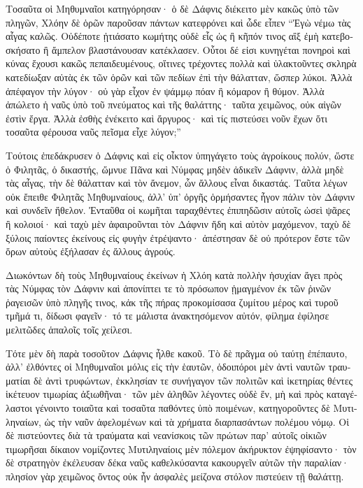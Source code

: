 \documentclass{book}
\begin{document}
\begin{pairs}
\begin{Leftside}
\begin{greek}
  Τοσαῦτα οἱ Μηθυμναῖοι κατηγόρησαν· ὁ δὲ Δάφνις διέκειτο μὲν κακῶς ὑπὸ τῶν πληγῶν, Χλόην δὲ ὁρῶν παροῦσαν πάντων κατεφρόνει καὶ ὧδε εἶπεν “Ἐγὼ νέμω τὰς αἶγας καλῶς. Οὐδέποτε ᾐτιάσατο κωμήτης οὐδὲ εἷς ὡς ἢ κῆπόν τινος αἲξ ἐμὴ κατεβοσκήσατο ἢ ἄμπελον βλαστάνουσαν κατέκλασεν.  Οὗτοι δέ εἰσι κυνηγέται πονηροὶ καὶ κύνας ἔχουσι κακῶς πεπαιδευμένους, οἵτινες τρέχοντες πολλὰ καὶ ὑλακτοῦντες σκληρὰ κατεδίωξαν αὐτὰς ἐκ τῶν ὀρῶν καὶ τῶν πεδίων ἐπὶ τὴν θάλατταν, ὥσπερ λύκοι.  Ἀλλὰ ἀπέφαγον τὴν λύγον· οὐ γὰρ εἶχον ἐν ψάμμῳ πόαν ἢ κόμαρον ἢ θύμον. Ἀλλὰ ἀπώλετο ἡ ναῦς ὑπὸ τοῦ πνεύματος καὶ τῆς θαλάττης· ταῦτα χειμῶνος, οὐκ αἰγῶν ἐστὶν ἔργα. Ἀλλὰ ἐσθὴς ἐνέκειτο καὶ ἄργυρος· καὶ τίς πιστεύσει νοῦν ἔχων ὅτι τοσαῦτα φέρουσα ναῦς πεῖσμα εἶχε λύγον;”
\pend


  Τούτοις ἐπεδάκρυσεν ὁ Δάφνις καὶ εἰς οἶκτον ὑπηγάγετο τοὺς ἀγροίκους πολύν, ὥστε ὁ Φιλητᾶς, ὁ δικαστής, ὤμνυε Πᾶνα καὶ Νύμφας μηδὲν ἀδικεῖν Δάφνιν, ἀλλὰ μηδὲ τὰς αἶγας, τὴν δὲ θάλατταν καὶ τὸν ἄνεμον, ὧν ἄλλους εἶναι δικαστάς.  Ταῦτα λέγων οὐκ ἔπειθε Φιλητᾶς Μηθυμναίους, ἀλλ’ ὑπ’ ὀργῆς ὁρμήσαντες ἦγον πάλιν τὸν Δάφνιν καὶ συνδεῖν ἤθελον.  Ἐνταῦθα οἱ κωμῆται ταραχθέντες ἐπιπηδῶσιν αὐτοῖς ὡσεὶ ψᾶρες ἢ κολοιοί· καὶ ταχὺ μὲν ἀφαιροῦνται τὸν Δάφνιν ἤδη καὶ αὐτὸν μαχόμενον, ταχὺ δὲ ξύλοις παίοντες ἐκείνους εἰς φυγὴν ἐτρέψαντο· ἀπέστησαν δὲ οὐ πρότερον ἔστε τῶν ὅρων αὐτοὺς ἐξήλασαν ἐς ἄλλους ἀγρούς.
\pend


  Διωκόντων δὴ τοὺς Μηθυμναίους ἐκείνων ἡ Χλόη κατὰ πολλὴν ἡσυχίαν ἄγει πρὸς τὰς Νύμφας τὸν Δάφνιν καὶ ἀπονίπτει τε τὸ πρόσωπον ᾑμαγμένον ἐκ τῶν ῥινῶν ῥαγεισῶν ὑπὸ πληγῆς τινος, κἀκ τῆς πήρας προκομίσασα ζυμίτου μέρος καὶ τυροῦ τμῆμά τι, δίδωσι φαγεῖν· τό τε μάλιστα ἀνακτησόμενον αὐτόν, φίλημα ἐφίλησε μελιτῶδες ἁπαλοῖς τοῖς χείλεσι.
\pend


  Τότε μὲν δὴ παρὰ τοσοῦτον Δάφνις ἦλθε κακοῦ. Τὸ δὲ πρᾶγμα οὐ ταύτῃ ἐπέπαυτο, ἀλλ’ ἐλθόντες οἱ Μηθυμναῖοι μόλις εἰς τὴν ἑαυτῶν, ὁδοιπόροι μὲν ἀντὶ ναυτῶν τραυματίαι δὲ ἀντὶ τρυφώντων, ἐκκλησίαν τε συνήγαγον τῶν πολιτῶν καὶ ἱκετηρίας θέντες ἱκέτευον τιμωρίας ἀξιωθῆναι·  τῶν μὲν ἀληθῶν λέγοντες οὐδὲ ἕν, μὴ καὶ πρὸς καταγέλαστοι γένοιντο τοιαῦτα καὶ τοσαῦτα παθόντες ὑπὸ ποιμένων, κατηγοροῦντες δὲ Μυτιληναίων, ὡς τὴν ναῦν ἀφελομένων καὶ τὰ χρήματα διαρπασάντων πολέμου νόμῳ.  Οἱ δὲ πιστεύοντες διὰ τὰ τραύματα καὶ νεανίσκοις τῶν πρώτων παρ’ αὐτοῖς οἰκιῶν τιμωρῆσαι δίκαιον νομίζοντες Μυτιληναίοις μὲν πόλεμον ἀκήρυκτον ἐψηφίσαντο· τὸν δὲ στρατηγὸν ἐκέλευσαν δέκα ναῦς καθελκύσαντα κακουργεῖν αὐτῶν τὴν παραλίαν· πλησίον γὰρ χειμῶνος ὄντος οὐκ ἦν ἀσφαλὲς μείζονα στόλον πιστεύειν τῇ θαλάττῃ.
\pend



\end{greek}
\end{Leftside}
\end{pairs}
\end{document}
